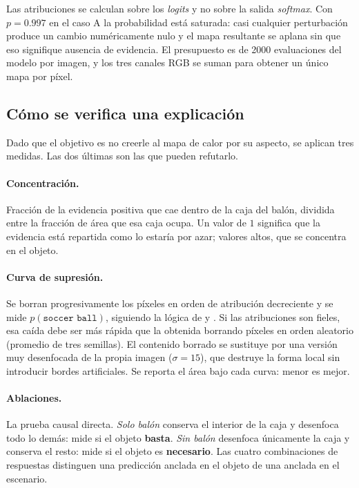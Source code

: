 \documentclass[11pt]{article}
\begin{document}
Las atribuciones se calculan sobre los \emph{logits} y no sobre la salida
\emph{softmax}. Con $p = 0.997$ en el caso A la probabilidad está saturada: casi
cualquier perturbación produce un cambio numéricamente nulo y el mapa resultante se
aplana sin que eso signifique ausencia de evidencia. El presupuesto es de 2000
evaluaciones del modelo por imagen, y los tres canales RGB se suman para obtener un
único mapa por píxel.

\subsection{Cómo se verifica una explicación}

Dado que el objetivo es no creerle al mapa de calor por su aspecto, se aplican tres
medidas. Las dos últimas son las que pueden refutarlo.

\paragraph{Concentración.} Fracción de la evidencia positiva que cae dentro de la caja
del balón, dividida entre la fracción de área que esa caja ocupa. Un valor de $1$
significa que la evidencia está repartida como lo estaría por azar; valores altos, que
se concentra en el objeto.

\paragraph{Curva de supresión.} Se borran progresivamente los píxeles en orden de
atribución decreciente y se mide $p(\texttt{soccer ball})$, siguiendo la lógica de
\citet{samek2017evaluating} y \citet{petsiuk2018rise}. Si las atribuciones son fieles,
esa caída debe ser más rápida que la obtenida borrando píxeles en orden aleatorio
(promedio de tres semillas). El contenido borrado se sustituye por una versión muy
desenfocada de la propia imagen ($\sigma = 15$), que destruye la forma local sin
introducir bordes artificiales. Se reporta el área bajo cada curva: menor es mejor.

\paragraph{Ablaciones.} La prueba causal directa. \emph{Solo balón} conserva el
interior de la caja y desenfoca todo lo demás: mide si el objeto \textbf{basta}.
\emph{Sin balón} desenfoca únicamente la caja y conserva el resto: mide si el objeto
es \textbf{necesario}. Las cuatro combinaciones de respuestas distinguen una
predicción anclada en el objeto de una anclada en el escenario.
\end{document}

